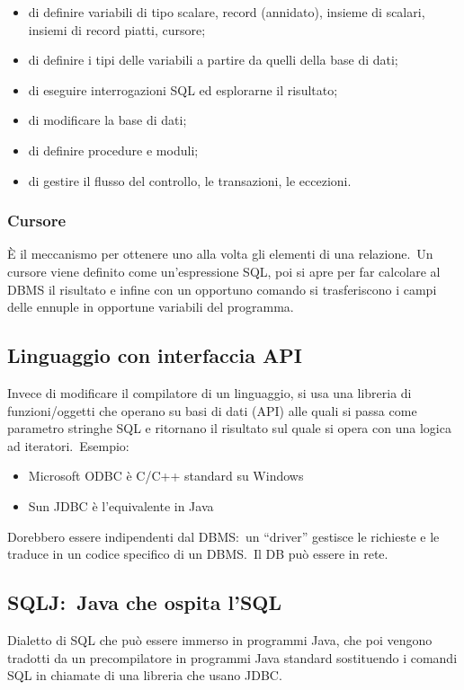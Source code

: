 \begin{itemize}
	\item di definire variabili di tipo scalare, record (annidato), insieme di scalari, insiemi di record piatti, cursore;
	\item di definire i tipi delle variabili a partire da quelli della base di dati;
	\item di eseguire interrogazioni SQL ed esplorarne il risultato;
	\item di modificare la base di dati;
	\item di definire procedure e moduli;
	\item di gestire il flusso del controllo, le transazioni, le eccezioni.
\end{itemize}

\subsubsection{Cursore}

È il meccanismo per ottenere uno alla volta gli elementi di una relazione.\
Un cursore viene definito come un'espressione SQL, poi si apre per far calcolare al DBMS il risultato e infine con un opportuno comando si trasferiscono i campi delle ennuple in opportune variabili del programma.

\subsection{Linguaggio con interfaccia API}

Invece di modificare il compilatore di un linguaggio, si usa una libreria di funzioni/oggetti che operano su basi di dati (API) alle quali si passa come parametro stringhe SQL e ritornano il risultato sul quale si opera con una logica ad iteratori.\
Esempio:
\begin{itemize}
	\item Microsoft ODBC è C/C++ standard su Windows
	\item Sun JDBC è l'equivalente in Java
\end{itemize}
Dorebbero essere indipendenti dal DBMS:\ un ``driver'' gestisce le richieste e le traduce in un codice specifico di un DBMS.\
Il DB può essere in rete.

\subsection{SQLJ:\ Java che ospita l'SQL}

Dialetto di SQL che può essere immerso in programmi Java, che poi vengono tradotti da un precompilatore in programmi Java standard sostituendo i comandi SQL in chiamate di una libreria che usano JDBC.
